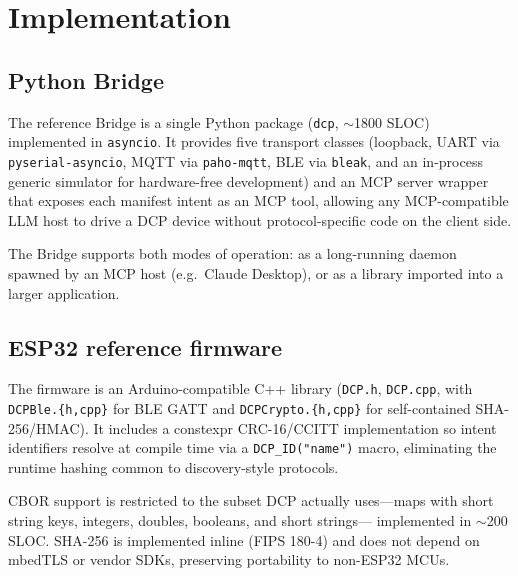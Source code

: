 \documentclass[11pt,a4paper]{article}
\begin{document}
\section{Implementation}\label{sec:impl}

\subsection{Python Bridge}

The reference Bridge is a single Python package
(\texttt{dcp}, $\sim$1800 SLOC) implemented in \texttt{asyncio}. It provides
five transport classes (loopback, UART via \texttt{pyserial-asyncio}, MQTT
via \texttt{paho-mqtt}, BLE via \texttt{bleak}, and an in-process generic
simulator for hardware-free development) and an MCP server wrapper that
exposes each manifest intent as an MCP tool, allowing any MCP-compatible
LLM host to drive a DCP device without protocol-specific code on the
client side.

The Bridge supports both modes of operation: as a long-running daemon
spawned by an MCP host (e.g.\ Claude Desktop), or as a library imported
into a larger application.

\subsection{ESP32 reference firmware}

The firmware is an Arduino-compatible C++ library (\texttt{DCP.h},
\texttt{DCP.cpp}, with \texttt{DCPBle.\{h,cpp\}} for BLE GATT and
\texttt{DCPCrypto.\{h,cpp\}} for self-contained SHA-256/HMAC). It includes
a constexpr CRC-16/CCITT implementation so intent identifiers resolve at
compile time via a \texttt{DCP\_ID("name")} macro, eliminating the runtime
hashing common to discovery-style protocols.

CBOR support is restricted to the subset DCP actually uses---maps with
short string keys, integers, doubles, booleans, and short strings---
implemented in $\sim$200 SLOC. SHA-256 is implemented inline (FIPS 180-4)
and does not depend on mbedTLS or vendor SDKs, preserving portability to
non-ESP32 MCUs.
\end{document}
